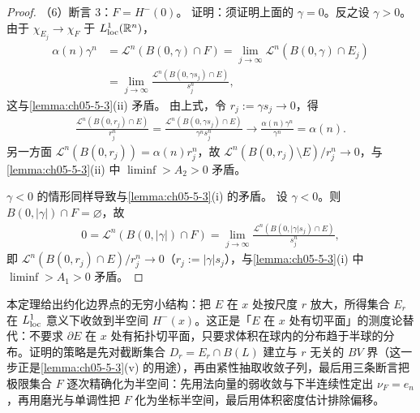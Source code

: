 \documentclass[../../main.tex]{subfiles}%
\begin{document}
\begin{proof}
（6）断言 3：$F=H^-(0)$。
证明：须证明上面的 $\gamma=0$。反之设 $\gamma>0$。由于 $\chi_{E_j}\to\chi_F$ 于 $L^1_{\mathrm{loc}}(\mathbb{R}^n)$，
\begin{align*}
\alpha(n)\gamma^n
&=\mathcal{L}^n(B(0,\gamma)\cap F)=\lim_{j\to\infty}\mathcal{L}^n(B(0,\gamma)\cap E_j)\\
&=\lim_{j\to\infty}\frac{\mathcal{L}^n(B(0,\gamma s_j)\cap E)}{s_j^n},
\end{align*}
这与\cref{lemma:ch05-5-3}(ii) 矛盾。%
由上式，令 $r_j:=\gamma s_j\to0$，得
\begin{align*}
\frac{\mathcal{L}^n(B(0,r_j)\cap E)}{r_j^n}=\frac{\mathcal{L}^n(B(0,\gamma s_j)\cap E)}{\gamma^ns_j^n}\to\frac{\alpha(n)\gamma^n}{\gamma^n}=\alpha(n).
\end{align*}
另一方面 $\mathcal{L}^n(B(0,r_j))=\alpha(n)r_j^n$，故 $\mathcal{L}^n(B(0,r_j)\setminus E)/r_j^n\to0$，与\cref{lemma:ch05-5-3}(ii) 中 $\liminf>A_2>0$ 矛盾。%

$\gamma<0$ 的情形同样导致与\cref{lemma:ch05-5-3}(i) 的矛盾。%
设 $\gamma<0$。则 $B(0,\lvert\gamma\rvert)\cap F=\varnothing$，故
\begin{align*}
0=\mathcal{L}^n(B(0,\lvert\gamma\rvert)\cap F)=\lim_{j\to\infty}\frac{\mathcal{L}^n(B(0,\lvert\gamma\rvert s_j)\cap E)}{s_j^n},
\end{align*}
即 $\mathcal{L}^n(B(0,r_j)\cap E)/r_j^n\to0$（$r_j:=\lvert\gamma\rvert s_j$），与\cref{lemma:ch05-5-3}(i) 中 $\liminf>A_1>0$ 矛盾。%
\end{proof}

\begin{remark}\label{remark:ch05-thm-5-13-动机}
本定理给出约化边界点的无穷小结构：把 $E$ 在 $x$ 处按尺度 $r$ 放大，所得集合 $E_r$ 在 $L^1_{\mathrm{loc}}$ 意义下收敛到半空间 $H^-(x)$。这正是「$E$ 在 $x$ 处有切平面」的测度论替代：不要求 $\partial E$ 在 $x$ 处有拓扑切平面，只要求体积在球内的分布趋于半球的分布。证明的策略是先对截断集合 $D_r=E_r\cap B(L)$ 建立与 $r$ 无关的 $BV$ 界（这一步正是\cref{lemma:ch05-5-3}(v) 的用途），再由紧性抽取收敛子列，最后用三条断言把极限集合 $F$ 逐次精确化为半空间：先用法向量的弱收敛与下半连续性定出 $\nu_F=e_n$，再用磨光与单调性把 $F$ 化为坐标半空间，最后用体积密度估计排除偏移。%
\end{remark}
\end{document}
